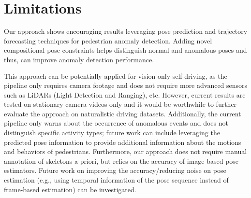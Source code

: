 \documentclass[nohyperref]{article}
\theoremstyle{plain}
\theoremstyle{definition}
\theoremstyle{remark}
\begin{document}
\vspace{-4mm}

\section{Limitations}
\vspace{-1mm}
Our approach shows encouraging results leveraging pose prediction and trajectory forecasting techniques for pedestrian anomaly detection. Adding novel compositional pose constraints helps distinguish normal and anomalous poses and thus, can improve anomaly detection performance. 
\vspace{-1mm}

This approach can be potentially applied for vision-only self-driving, as the pipeline only requires camera footage and does not require
more advanced sensors such as LiDARs (Light Detection and Ranging), etc. However, current results are tested on stationary camera videos only and it would be worthwhile to further evaluate the approach on naturalistic driving datasets. Additionally, the current pipeline only warns about the occurrence of anomalous events and does not distinguish specific activity types; future work can include leveraging the predicted pose information to provide additional information about the motions and behaviors of pedestrians. 
Furthermore, our approach does not require manual annotation of skeletons a priori, but relies on the accuracy of image-based pose estimators. Future work on improving the accuracy/reducing noise on pose estimation (e.g., using temporal information of the pose sequence instead of frame-based estimation) can be investigated.








































\vspace{-4mm}
\end{document}
